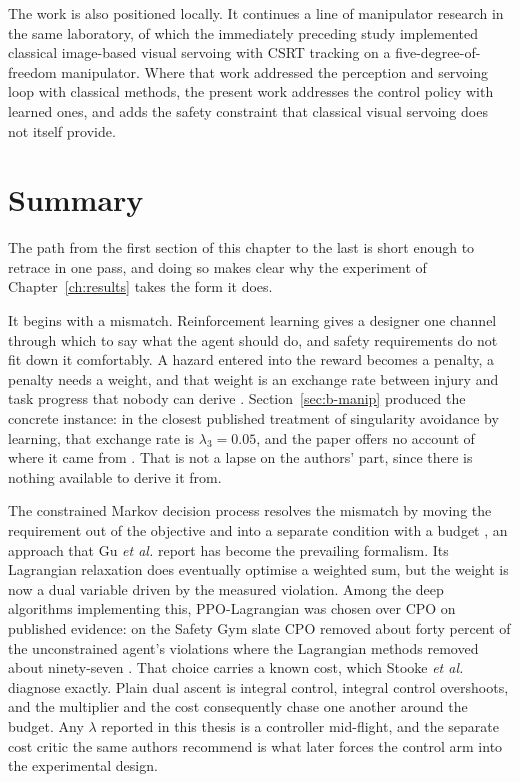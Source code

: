 The work is also positioned locally. It continues a line of manipulator research in the same
laboratory, of which the immediately preceding study \cite{khan2025csrt_ibvs} implemented
classical image-based visual servoing with CSRT tracking on a five-degree-of-freedom
manipulator. Where that work addressed the perception and servoing loop with classical methods,
the present work addresses the control policy with learned ones, and adds the safety constraint
that classical visual servoing does not itself provide.

\section{Summary}\label{sec:b-summary}

The path from the first section of this chapter to the last is short enough to retrace in one
pass, and doing so makes clear why the experiment of Chapter~\ref{ch:results} takes the form it
does.

It begins with a mismatch. Reinforcement learning gives a designer one channel through which to
say what the agent should do, and safety requirements do not fit down it comfortably. A hazard
entered into the reward becomes a penalty, a penalty needs a weight, and that weight is an
exchange rate between injury and task progress that nobody can derive
\cite{achiam2017cpo,ray2019benchmarking}. Section~\ref{sec:b-manip} produced the concrete
instance: in the closest published treatment of singularity avoidance by learning, that exchange
rate is \(\lambda_{3}=0.05\), and the paper offers no account of where it came from
\cite{shen2022reactive}. That is not a lapse on the authors' part, since there is nothing
available to derive it from.

The constrained Markov decision process resolves the mismatch by moving the requirement out of
the objective and into a separate condition with a budget \cite{altman1999cmdp}, an approach that
Gu \emph{et al.} \cite{gu2024review} report has become the prevailing formalism. Its Lagrangian
relaxation does eventually optimise a weighted sum, but the weight is now a dual variable driven
by the measured violation. Among the deep algorithms implementing this, PPO-Lagrangian was chosen
over CPO on published evidence: on the Safety Gym slate CPO removed about forty percent of the
unconstrained agent's violations where the Lagrangian methods removed about ninety-seven
\cite{ray2019benchmarking}. That choice carries a known cost, which Stooke \emph{et al.}
\cite{stooke2020pid} diagnose exactly. Plain dual ascent is integral control, integral control
overshoots, and the multiplier and the cost consequently chase one another around the budget. Any
\(\lambda\) reported in this thesis is a controller mid-flight, and the separate cost critic the
same authors recommend is what later forces the control arm into the experimental design.


